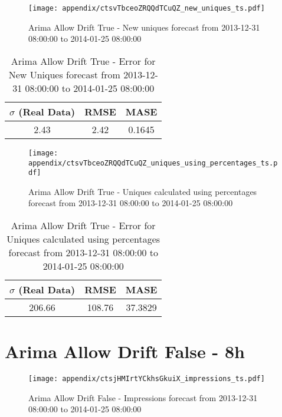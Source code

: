 \begin{figure}[H] \begin{center} \leavevmode
\texttt{[image: appendix/ctsvTbceoZRQQdTCuQZ\_new\_uniques\_ts.pdf]} \caption{
Arima Allow Drift True - New uniques forecast from 2013-12-31 08:00:00 to 2014-01-25 08:00:00} \label{fig:appendix/ctsvTbceoZRQQdTCuQZ_new_uniques_ts.pdf} \end{center}
\end{figure}

\begin{table}[H]
\centering
\footnotesize
\begin{tabular}{ccc}
$\sigma$ (Real Data) & RMSE & MASE   \\ \hline
2.43 & 2.42 & 0.1645 \\
\end{tabular}

\vspace{0.5cm}

\caption{
Arima Allow Drift True - Error for New Uniques forecast from 2013-12-31 08:00:00 to 2014-01-25 08:00:00}
\end{table}

\begin{figure}[H] \begin{center} \leavevmode
\texttt{[image: appendix/ctsvTbceoZRQQdTCuQZ\_uniques\_using\_percentages\_ts.pdf]} \caption{
Arima Allow Drift True - Uniques calculated using percentages forecast from 2013-12-31 08:00:00 to 2014-01-25 08:00:00} \label{fig:appendix/ctsvTbceoZRQQdTCuQZ_uniques_using_percentages_ts.pdf} \end{center}
\end{figure}

\begin{table}[H]
\centering
\footnotesize
\begin{tabular}{ccc}
$\sigma$ (Real Data) & RMSE & MASE   \\ \hline
206.66 & 108.76 & 37.3829 \\
\end{tabular}

\vspace{0.5cm}

\caption{
Arima Allow Drift True - Error for Uniques calculated using percentages forecast from 2013-12-31 08:00:00 to 2014-01-25 08:00:00}
\end{table}

\section{Arima Allow Drift False - 8h}
\begin{figure}[H] \begin{center} \leavevmode
\texttt{[image: appendix/ctsjHMIrtYCkhsGkuiX\_impressions\_ts.pdf]} \caption{
Arima Allow Drift False - Impressions forecast from 2013-12-31 08:00:00 to 2014-01-25 08:00:00} \label{fig:appendix/ctsjHMIrtYCkhsGkuiX_impressions_ts.pdf} \end{center}
\end{figure}

